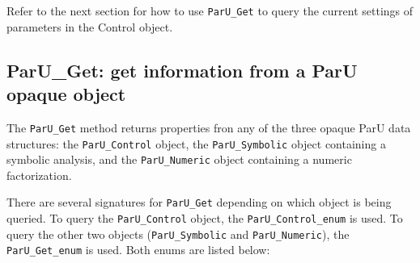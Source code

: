 \documentclass[12pt]{article}
\begin{document}
Refer to the next section for how to use \verb'ParU_Get' to query
the current settings of parameters in the Control object.

\subsection{{\sf ParU\_Get}: get information from a ParU opaque object}
\label{get}

The \verb'ParU_Get' method returns properties fron any of the three opaque ParU
data structures: the \verb'ParU_Control' object, the \verb'ParU_Symbolic'
object containing a symbolic analysis, and the \verb'ParU_Numeric' object
containing a numeric factorization.

There are several signatures for \verb'ParU_Get' depending on which
object is being queried.  To query the \verb'ParU_Control' object,
the \verb'ParU_Control_enum' is used.  To query the other two objects
(\verb'ParU_Symbolic' and  \verb'ParU_Numeric'), the
\verb'ParU_Get_enum' is used.  Both enums are listed below:
\end{document}
